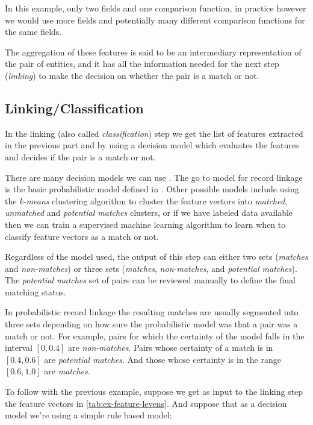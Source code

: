\documentclass[epsfig,a4paper,11pt,titlepage,twoside,openany]{book}
\begin{document}
In this example, only two fields and one comparison function, in practice
however we would use more fields and potentially many different comparison
functions for the same fields.

The aggregation of these features is said to be an intermediary representation
of the pair of entities, and it has all the information needed for the next step
(\textit{linking}) to make the decision on whether the pair is a match or not.

  
\subsection{Linking/Classification}
\label{sec:rl-workflow-linking}


In the linking (also called \textit{classification}) step we get the list of
features extracted in the previous part and by using a decision model which
evaluates the features and decides if the pair is a match or not.

There are many decision models we can use \cite{gu06_decis_model_recor_linkag}.
The go to model for record linkage is the basic probabilistic model defined in
\cite{fellegi69_theor_recor_linkag}. Other possible models \cite{Elfeky} include
using the \textit{k-means} \cite{Hartigan1979} clustering algorithm to cluster
the feature vectors into \textit{matched}, \textit{unmatched} and
\textit{potential matches} clusters, or if we have labeled data available then
we can train a supervised machine learning algorithm to learn when to classify
feature vectors as a match or not.

Regardless of the model used, the output of this step can either two sets
(\textit{matches} and \textit{non-matches}) or three sets (\textit{matches},
\textit{non-matches}, and \textit{potential matches}). The \textit{potential
  matches} set of pairs can be reviewed manually to define the final matching
status.

In probabilistic record linkage \cite{fellegi69_theor_recor_linkag} the
resulting matches are usually segmented into three sets depending on how sure
the probabilistic model was that a pair was a match or not. For example, pairs
for which the certainty of the model falls in the interval $[0, 0.4]$ are
\textit{non-matches}. Pairs whose certainty of a match is in $[0.4, 0.6]$ are
\textit{potential matches}. And those whose certainty is in the range $[0.6,
1.0]$ are \textit{matches}.

To follow with the previous example, suppose we get as input to the linking step
the feature vectors in \autoref{tab:ex-feature-levens}. And suppose that as a
decision model we're using a simple rule based model:
\end{document}

